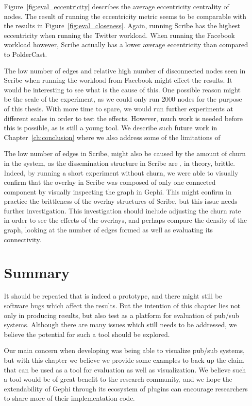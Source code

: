 Figure~\ref{fig:eval_eccentricity} describes the average eccentricity
centrality of nodes. The result of running the eccentricity metric seems
to be comparable with the results in Figure~\ref{fig:eval_closeness}.
Again, running Scribe has the highest eccentricity when running the
Twitter workload. When running the Facebook workload however, Scribe
actually has a lower average eccentricity than compared to PolderCast.

The low number of edges and relative high number of
disconnected nodes seen in Scribe when running the workload from
Facebook might effect the results. It would be interesting to see what
is the cause of this. One possible reason might be the scale of the
experiment, as we could only run 2000 nodes for the purpose of this thesis. With more
time to spare, we would run further experiments at different scales in
order to test the effects. However, much work is needed before this is
possible, as \demo{} is still a young tool. We describe such future work
in Chapter~\ref{ch:conclusion} where we also address some of the
limitations of \demo{}

The low number of edges in Scribe, might also be caused by the amount of
churn in the system, as the dissemination structure in Scribe are , in
theory, brittle. Indeed, by running a short experiment without churn, we were
able to visually confirm that the overlay in Scribe was composed of only
one connected component by visually inspecting the graph in Gephi. This
might confirm in practice the brittleness of the overlay structures of Scribe,
but this issue needs further investigation. This investigation should include
adjusting the churn rate in order to see the effects of the overlays,
and perhaps compare the density of the graph, looking at the number of
edges formed as well as evaluating its connectivity.

\section{Summary}

It should be repeated that \demo{} is indeed a prototype, and there
might still be software bugs which affect the results. But the intention
of this chapter lies not only in producing results, but also test
\demo{} as a platform for evaluation of pub/sub systems. Although there
are many issues which still needs to be addressed, we believe the
potential for such a tool should be explored.

Our main concern when developing \demo{} was being able to visualize
pub/sub systems, but with this chapter we believe we provide some
examples to back up the claim that \demo{} can be used as a tool for
evaluation as well as visualization. We believe such a tool would be of
great benefit to the research community, and we hope the extendability
of Gephi through its ecosystem of plugins can encourage researchers to share
more of their implementation code.

